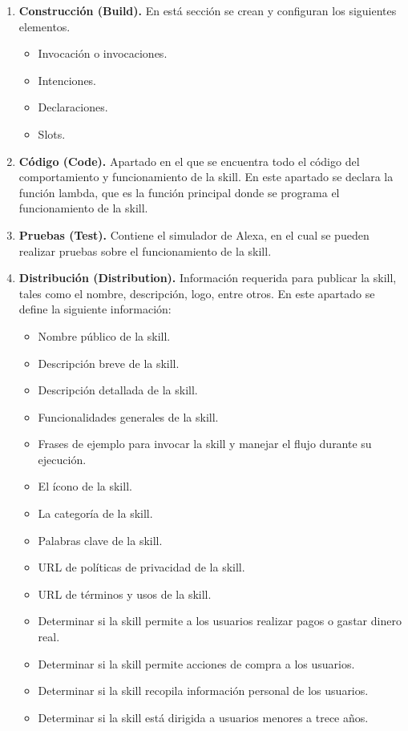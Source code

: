 \begin{enumerate}
  \item \textbf{Construcción (Build).} En está sección se crean y configuran los siguientes elementos.
  \begin{itemize}
    \item Invocación o invocaciones.
    \item Intenciones.
    \item Declaraciones.
    \item Slots.
  \end{itemize}
  \item \textbf{Código (Code).} Apartado en el que se encuentra todo el código del comportamiento y funcionamiento de la skill. En este apartado se declara la función lambda, que es la función principal donde se programa el funcionamiento de la skill.
  \item \textbf{Pruebas (Test).} Contiene el simulador de Alexa, en el cual se pueden realizar pruebas sobre el funcionamiento de la skill.
  \item \textbf{Distribución (Distribution).} Información requerida para publicar la skill, tales como el nombre, descripción, logo, entre otros. En este apartado se define la siguiente información:
  \begin{itemize}
    \item Nombre público de la skill.
    \item Descripción breve de la skill.
    \item Descripción detallada de la skill.
    \item Funcionalidades generales de la skill.
    \item Frases de ejemplo para invocar la skill y manejar el flujo durante su ejecución.
    \item El ícono de la skill.
    \item La categoría de la skill.
    \item Palabras clave de la skill.
    \item URL de políticas de privacidad de la skill.
    \item URL de términos y usos de la skill.
    \item Determinar si la skill permite a los usuarios realizar pagos o gastar dinero real.
    \item Determinar si la skill permite acciones de compra a los usuarios.
    \item Determinar si la skill recopila información personal de los usuarios.
    \item Determinar si la skill está dirigida a usuarios menores a trece años.

\end{itemize}
\end{enumerate}

